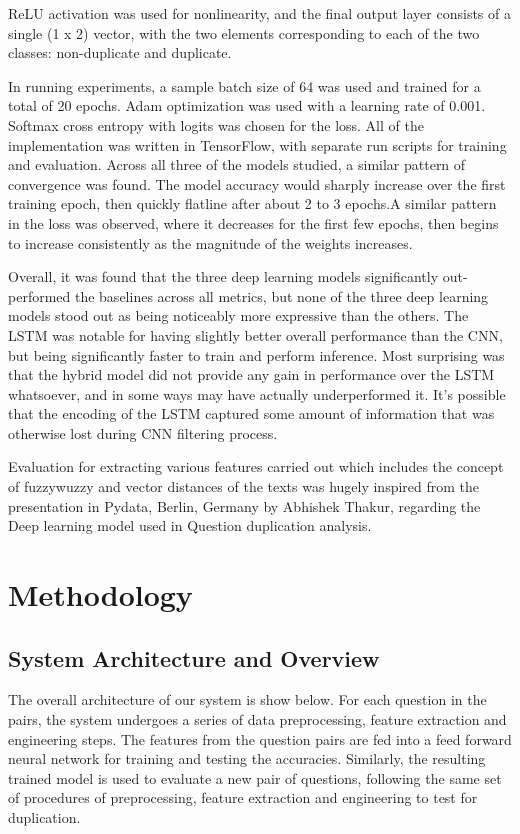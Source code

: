 ReLU activation was used for nonlinearity, and the final output layer consists of a single (1 x 2) vector, with the two
elements corresponding to each of the two classes: non-duplicate and duplicate.

In running experiments, a sample batch size of 64 was used and trained for a total of 20 epochs. Adam optimization was used with a learning rate of 0.001. Softmax cross entropy with logits was chosen for the loss. All of the implementation was written in TensorFlow, with separate run scripts for training and evaluation. Across all three of the models studied, a similar pattern of convergence was found. The model accuracy would sharply increase over the first training epoch, then quickly flatline after about 2 to 3 epochs.A similar pattern in the loss was observed, where it decreases for the first few epochs, then begins to increase consistently as the magnitude of the weights increases. 

Overall, it was found that the three deep learning models significantly out-performed the baselines across all metrics, but none of the three deep learning models stood out as being noticeably more expressive than the others. The \ac{LSTM} was notable for having slightly better overall performance than the \ac{CNN}, but being significantly faster to train and perform inference. Most surprising was that the hybrid model did not provide any gain in performance over the
\ac{LSTM} whatsoever, and in some ways may have actually underperformed it. It’s possible that the encoding of the LSTM captured some amount of information that was otherwise lost during \ac{CNN} filtering process.


Evaluation for extracting various features carried out which includes the concept of fuzzywuzzy and vector distances of the texts was hugely inspired from the presentation in Pydata, Berlin, Germany by Abhishek Thakur, regarding the Deep learning model\cite{AbskThakur} used in Question duplication analysis.

\chapter{Methodology}
\section{System Architecture and Overview}
The overall architecture of our system is show below. For each question in the pairs, the system undergoes a series of data preprocessing, feature extraction and engineering steps. The features from the question pairs are fed into a feed forward neural network for training and testing the accuracies. Similarly, the resulting trained model is used to evaluate a new pair of questions, following the same set of procedures of preprocessing, feature extraction and engineering to test for duplication.

